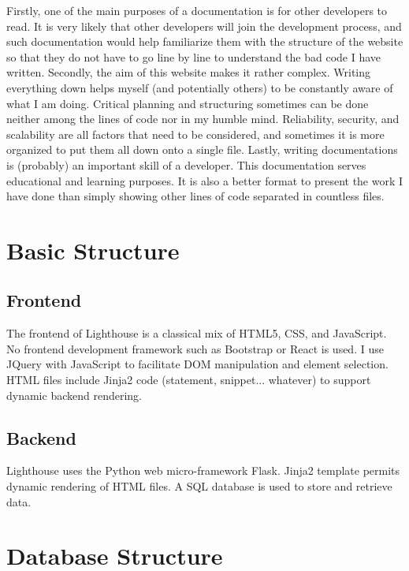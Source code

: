 \documentclass{article}
\begin{document}
Firstly, one of the main purposes of a documentation is for other developers to read. It is very likely that other developers will join the development process, and such documentation would help familiarize them with the structure of the website so that they do not have to go line by line to understand the bad code I have written.
Secondly, the aim of this website makes it rather complex. Writing everything down helps myself (and potentially others) to be constantly aware of what I am doing. Critical planning and structuring sometimes can be done neither among the lines of code nor in my humble mind. Reliability, security, and scalability are all factors that need to be considered, and sometimes it is more organized to put them all down onto a single file.
Lastly, writing documentations is (probably) an important skill of a developer. This documentation serves educational and learning purposes. It is also a better format to present the work I have done than simply showing other lines of code separated in countless files.


\section{Basic Structure}


\subsection{Frontend}

The frontend of Lighthouse is a classical mix of HTML5, CSS, and JavaScript. No frontend development framework such as Bootstrap or React is used. I use JQuery with JavaScript to facilitate DOM manipulation and element selection. HTML files include Jinja2 code (statement, snippet... whatever) to support dynamic backend rendering.

\subsection{Backend}

Lighthouse uses the Python web micro-framework Flask. Jinja2 template permits dynamic rendering of HTML files. A SQL database is used to store and retrieve data.


\section{Database Structure}
\end{document}
